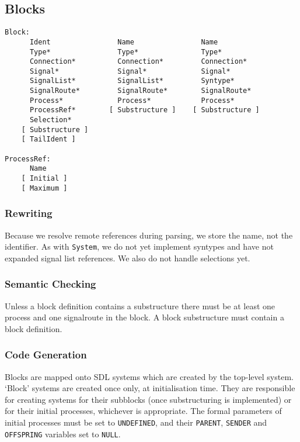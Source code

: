\subsection{Blocks}

\begin{verbatim}
Block:
      Ident                Name                Name
      Type*                Type*               Type*
      Connection*          Connection*         Connection*
      Signal*              Signal*             Signal*
      SignalList*          SignalList*         Syntype*
      SignalRoute*         SignalRoute*        SignalRoute*
      Process*             Process*            Process*
      ProcessRef*        [ Substructure ]    [ Substructure ]
      Selection*
    [ Substructure ]     
    [ TailIdent ]

ProcessRef:
      Name
    [ Initial ]
    [ Maximum ]
\end{verbatim}

\subsubsection{Rewriting}

Because we resolve remote references during parsing, we store the name,
not the identifier.
As with {\tt System}, we do not yet implement syntypes
and have not expanded signal list references.
We also do not handle selections yet.

\subsubsection{Semantic Checking}

Unless a block definition contains a substructure there must be at
least one process and one signalroute in the block.
A block substructure must contain a block definition.

\subsubsection{Code Generation}

Blocks are mapped onto SDL systems which are created by the top-level
system. 
`Block' systems are created once only, at initialisation
time.
They are responsible for creating systems for their subblocks
(once substructuring is implemented) or for their initial processes,
whichever is appropriate.
The formal parameters of initial processes
must be set to {\tt UNDEFINED}, and their 
{\tt PARENT}, {\tt SENDER} and {\tt OFFSPRING}
variables set to {\tt NULL}.

